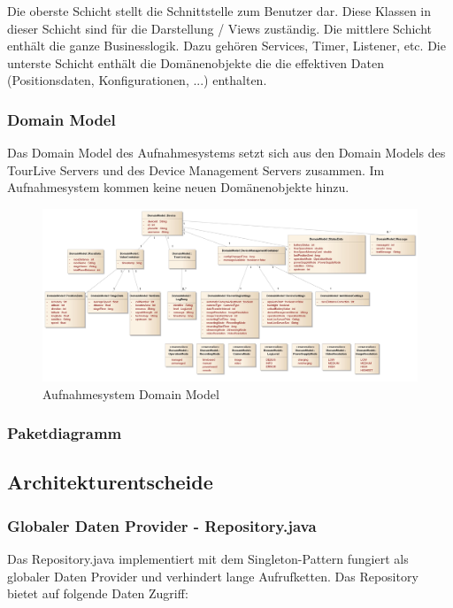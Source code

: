 Die oberste Schicht stellt die Schnittstelle zum Benutzer dar. Diese Klassen in dieser Schicht sind für die Darstellung / Views zuständig. Die mittlere Schicht enthält die ganze Businesslogik. Dazu gehören Services, Timer, Listener, etc. Die unterste Schicht enthält die Domänenobjekte die die effektiven Daten (Positionsdaten, Konfigurationen, ...) enthalten. 

\subsubsection{Domain Model}
Das Domain Model des Aufnahmesystems setzt sich aus den Domain Models des TourLive Servers und des Device Management Servers zusammen. Im Aufnahmesystem kommen keine neuen Domänenobjekte hinzu.

\begin{figure}[H]
\centering
\includegraphics[width=150mm]{images/android/domainmodel.jpg}
\caption{Aufnahmesystem Domain Model}
\end{figure}

\subsubsection{Paketdiagramm}

\subsection{Architekturentscheide}

\subsubsection{Globaler Daten Provider - Repository.java}
Das Repository.java implementiert mit dem Singleton-Pattern fungiert als globaler Daten Provider und verhindert lange Aufrufketten. Das Repository bietet auf folgende Daten Zugriff:

